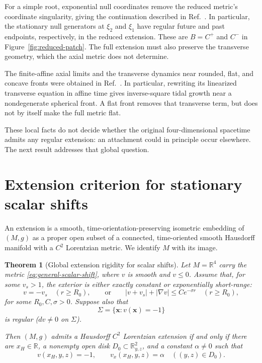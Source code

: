 \documentclass[10pt]{article}
\newtheorem{theorem}{Theorem}
\begin{document}
For a simple root, exponential null coordinates remove the reduced metric's
coordinate singularity, giving the continuation described in
Ref.~\cite[Sec.~II~A]{FinazziLiberatiBarcelo2009}.  In particular, the
stationary null generators at \(\xi_2\) and \(\xi_1\) have regular future
and past endpoints, respectively, in the reduced extension.  These are
\(B=C^+\) and \(C^-\) in Figure~\ref{fig:reduced-patch}.
The full extension must also preserve the transverse geometry, which the
axial metric does not determine.

The finite-affine axial limits and the transverse dynamics near rounded,
flat, and concave fronts were obtained in
Ref.~\cite[Secs.~3.1--3.3]{BarceloEtAl2022}.  In particular, rewriting its
linearized transverse equation in affine time gives inverse-square tidal
growth near a nondegenerate spherical front.  A flat front removes that
transverse term, but does not by itself make the full metric flat.

These local facts do not decide whether the original four-dimensional
spacetime admits any regular extension: an attachment could in principle
occur elsewhere.  The next result addresses that global question.

\section{Extension criterion for stationary scalar shifts}
\label{sec:maximality}

An extension is a smooth, time-orientation-preserving isometric embedding
of \((M,g)\) as a proper open subset of a connected, time-oriented smooth
Hausdorff manifold with a \(C^2\) Lorentzian metric.  We identify \(M\)
with its image.

\begin{samepage}
\begin{theorem}[Global extension rigidity for scalar shifts]
\label{thm:extension-rigidity}
Let \(M=\mathbb R^4\) carry the metric
\eqref{eq:general-scalar-shift}, where \(v\) is smooth and \(v\leq0\).
Assume that, for some
\(v_s>1\), the exterior is either exactly constant or exponentially
short-range:
\begin{equation}
  v=-v_s\quad(r\geq R_0),
  \qquad\text{or}\qquad
  |v+v_s|+|\nabla v|\leq Ce^{-\sigma r}
  \quad(r\geq R_0),
  \label{eq:general-scalar-tail}
\end{equation}
for some \(R_0,C,\sigma>0\).  Suppose also that
\begin{equation}
  \Sigma=\{\boldsymbol{x}:v(\boldsymbol{x})=-1\}
  \label{eq:general-wall}
\end{equation}
is regular (\(dv\ne0\) on \(\Sigma\)).

Then \((M,g)\) admits a Hausdorff \(C^2\) Lorentzian extension if and only
if there are
\(x_H\in\mathbb R\), a nonempty open disk
\(D_0\subset\mathbb R^2_{y,z}\), and a constant \(\alpha\ne0\) such that
\begin{equation}
  v(x_H,y,z)=-1,
  \qquad v_x(x_H,y,z)=\alpha
  \quad ((y,z)\in D_0).
  \label{eq:planar-cap-criterion}
\end{equation}
\end{theorem}
\end{samepage}
\end{document}
